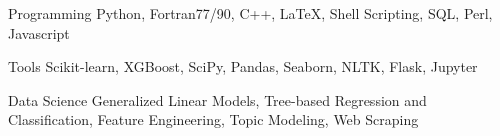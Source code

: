 


\begin{cvskills}








\cvskill
{Programming} %
{Python, Fortran77/90, C++, LaTeX, Shell Scripting, SQL, Perl, Javascript} %


\cvskill
{Tools} %
{Scikit-learn, XGBoost, SciPy, Pandas, Seaborn, NLTK, Flask, Jupyter} %



\cvskill
{Data Science} %
{Generalized Linear Models, Tree-based Regression and Classification, Feature Engineering, Topic Modeling, Web Scraping} %






\end{cvskills}

